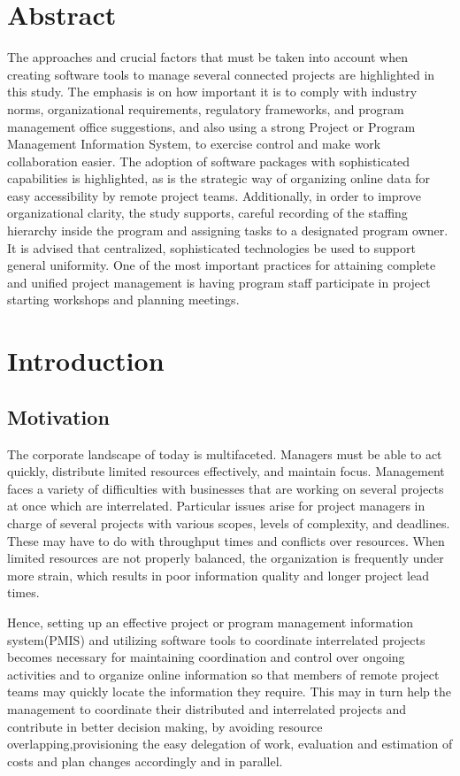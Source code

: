\documentclass{llncs}
\begin{document}
\section{Abstract}
The approaches and crucial factors that must be taken into account when creating software tools to manage several connected projects are highlighted in this study. The emphasis is on how important it is to comply with industry norms, organizational requirements, regulatory frameworks, and program management office suggestions, and also using a strong Project or Program Management Information System, to exercise control and make work collaboration easier. The adoption of software packages with sophisticated capabilities is highlighted, as is the strategic way of organizing online data for easy accessibility by remote project teams. Additionally, in order to improve organizational clarity, the study supports, careful recording of the staffing hierarchy inside the program and assigning tasks to a designated program owner. It is advised that centralized, sophisticated technologies be used to support general uniformity. One of the most important practices for attaining complete and unified project management is having program staff participate in project starting workshops and planning meetings.


\tableofcontents

\newpage

\section{Introduction}

\subsection{Motivation}
The corporate landscape of today is multifaceted. Managers must be able to act quickly, distribute limited resources effectively, and maintain focus. Management faces a variety of difficulties with businesses that are working on several projects at once which are interrelated. Particular issues arise for project managers in charge of several projects with various scopes, levels of complexity, and deadlines. These may have to do with throughput times and conflicts over resources. When limited resources are not properly balanced, the organization is frequently under more strain, which results in poor information quality and longer project lead times.~\cite{refpaper1}

Hence, setting up an effective project or program management information system(PMIS) and utilizing software tools to coordinate interrelated projects becomes necessary for maintaining coordination and control over ongoing activities and to organize online information so that members of remote project teams may quickly locate the information they require. This may in turn help the management to coordinate their distributed and interrelated projects and contribute in better decision making, by avoiding resource overlapping,provisioning the easy delegation of work, evaluation and estimation of costs and plan changes accordingly and in parallel.~\cite{refpaper1}
\end{document}
